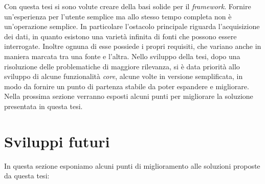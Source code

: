 Con questa tesi si sono volute creare della basi solide per il \emph{framework}. Fornire un'esperienza per l'utente semplice ma allo stesso tempo completa non è un'operazione semplice. In particolare l'ostacolo principale riguarda l'acquisizione dei dati, in quanto esistono una varietà infinita di fonti che possono essere interrogate. Inoltre ognuna di esse possiede i propri requisiti, che variano anche in maniera marcata tra una fonte e l'altra. Nello sviluppo della tesi, dopo una risoluzione delle problematiche di maggiore rilevanza, si è data priorità allo sviluppo di alcune funzionalità \emph{core}, alcune volte in versione semplificata, in modo da fornire un punto di partenza stabile da poter espandere e migliorare. Nella prossima sezione verranno esposti alcuni punti per migliorare la soluzione presentata in questa tesi.

\section{Sviluppi futuri}

In questa sezione esponiamo alcuni punti di miglioramento alle soluzioni proposte da questa tesi:

